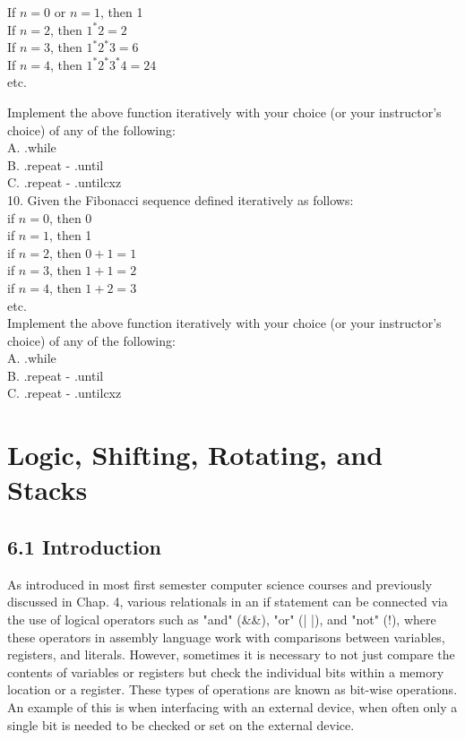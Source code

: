 \documentclass[10pt]{article}
\begin{document}
If $n=0$ or $n=1$, then 1\\
If $n=2$, then $1^{*} 2=2$\\
If $n=3$, then $1^{*} 2^{*} 3=6$\\
If $n=4$, then $1^{*} 2^{*} 3^{*} 4=24$\\
etc.

Implement the above function iteratively with your choice (or your instructor's choice) of any of the following:\\
A. .while\\
B. .repeat - .until\\
C. .repeat - .untilcxz\\
10. Given the Fibonacci sequence defined iteratively as follows:\\
if $n=0$, then 0\\
if $n=1$, then 1\\
if $n=2$, then $0+1=1$\\
if $n=3$, then $1+1=2$\\
if $n=4$, then $1+2=3$\\
etc.\\
Implement the above function iteratively with your choice (or your instructor's choice) of any of the following:\\
A. .while\\
B. .repeat - .until\\
C. .repeat - .untilcxz

\section*{Logic, Shifting, Rotating, and Stacks}
\subsection*{6.1 Introduction}
As introduced in most first semester computer science courses and previously discussed in Chap. 4, various relationals in an if statement can be connected via the use of logical operators such as "and" (\&\&), "or" (| |), and "not" (!), where these operators in assembly language work with comparisons between variables, registers, and literals. However, sometimes it is necessary to not just compare the contents of variables or registers but check the individual bits within a memory location or a register. These types of operations are known as bit-wise operations. An example of this is when interfacing with an external device, when often only a single bit is needed to be checked or set on the external device.
\end{document}
